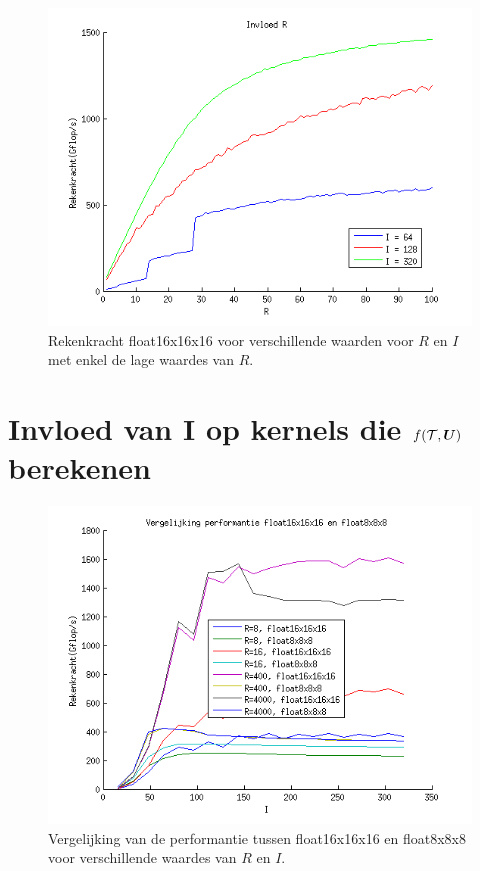 \begin{figure}
\centering
\includegraphics{invlR100}
\caption{\label{invlR100}Rekenkracht float16x16x16 voor verschillende waarden voor $R$ en $I$ met enkel de lage waardes van $R$.}
\end{figure}

\section{Invloed van I op kernels die $f(\mathcal{T}, \boldsymbol{U})$ berekenen}
\begin{figure}[h]
\centering
\includegraphics{fl16_vs_fl8_groot}
\caption{\label{fl16_vs_fl8} Vergelijking van de performantie tussen float16x16x16 en float8x8x8 voor verschillende waardes van $R$ en $I$.}
\end{figure}

